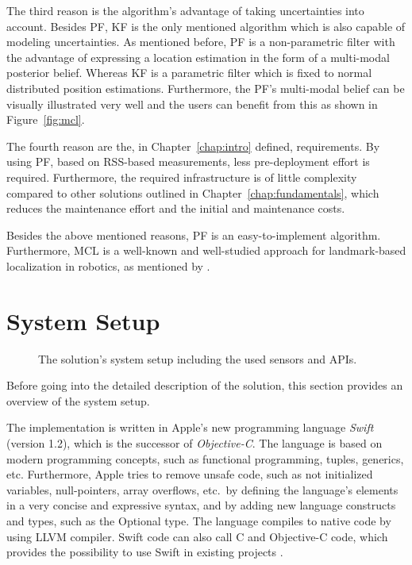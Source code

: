 The third reason is the algorithm's advantage of taking uncertainties into account. Besides \ac{PF}, \ac{KF} is the only mentioned algorithm which is also capable of modeling uncertainties. As mentioned before, \acs{PF} is a non-parametric filter with the advantage of expressing a location estimation in the form of a multi-modal posterior belief. Whereas \ac{KF} is a parametric filter which is fixed to normal distributed position estimations. Furthermore, the \ac{PF}'s multi-modal belief can be visually illustrated very well and the users can benefit from this as shown in Figure~\ref{fig:mcl}.

The fourth reason are the, in Chapter~\ref{chap:intro} defined, requirements. By using \acs{PF}, based on \acs{RSS}-based measurements, less pre-deployment effort is required. Furthermore, the required infrastructure is of little complexity compared to other solutions outlined in Chapter~\ref{chap:fundamentals}, which reduces the maintenance effort and the initial and maintenance costs.

Besides the above mentioned reasons, \acl{PF} is an easy-to-implement algorithm. Furthermore, \ac{MCL} is a well-known and well-studied approach for landmark-based localization in robotics, as mentioned by \citet{thrun:prob_robo}.


\section{System Setup}
\begin{figure}[height=0.45\textheight]
	
	\caption{The solution's system setup including the used sensors and \acsp{API}.}
	\label{fig:algo_architecture}
\end{figure}

Before going into the detailed description of the solution, this section provides an overview of the system setup.

The implementation is written in Apple's new programming language \emph{Swift} (version 1.2), which is the successor of \emph{Objective-C}. The language is based on modern programming concepts, such as functional programming, tuples, generics, etc. Furthermore, Apple tries to remove unsafe code, such as not initialized variables, null-pointers, array overflows, etc.\ by defining the language's elements in a very concise and expressive syntax, and by adding new language constructs and types, such as the Optional type. The language compiles to native code by using LLVM compiler. Swift code can also call C and Objective-C code, which provides the possibility to use Swift in existing projects \citep{apple:swift}.

